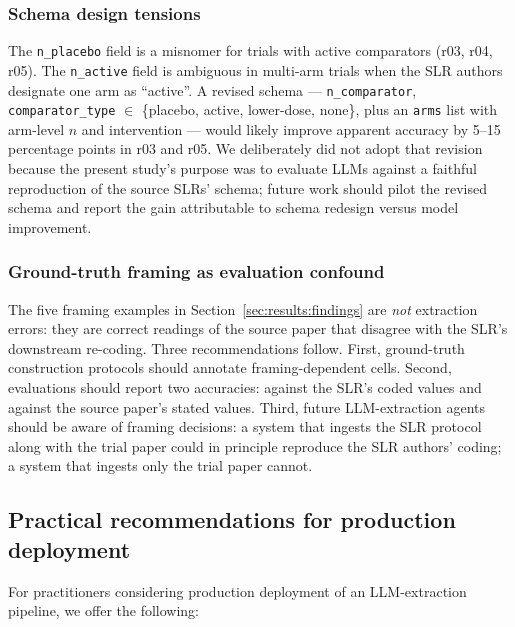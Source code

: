 \documentclass[a4paper,fleqn]{cas-sc}
\begin{document}
\subsubsection{Schema design tensions}

The \texttt{n\_placebo} field is a misnomer for trials with active
comparators (r03, r04, r05). The \texttt{n\_active} field is ambiguous
in multi-arm trials when the SLR authors designate one arm as ``active''.
A revised schema --- \texttt{n\_comparator}, \texttt{comparator\_type}
$\in$ \{placebo, active, lower-dose, none\}, plus an
\texttt{arms} list with arm-level $n$ and intervention --- would
likely improve apparent accuracy by 5--15 percentage points in r03 and r05.
We deliberately did not adopt that revision because the present study's
purpose was to evaluate LLMs against a faithful reproduction of the
source SLRs' schema; future work should pilot the revised schema and
report the gain attributable to schema redesign versus model
improvement.

\subsubsection{Ground-truth framing as evaluation confound}

The five framing examples in Section~\ref{sec:results:findings} are
\emph{not} extraction errors: they are correct readings of the source
paper that disagree with the SLR's downstream re-coding. Three
recommendations follow. First, ground-truth construction protocols
should annotate framing-dependent cells. Second, evaluations should
report two accuracies: against the SLR's coded values and against the
source paper's stated values. Third, future LLM-extraction agents should
be aware of framing decisions: a system that ingests the SLR protocol
along with the trial paper could in principle reproduce the SLR
authors' coding; a system that ingests only the trial paper cannot.

\subsection{Practical recommendations for production deployment}

For practitioners considering production deployment of an LLM-extraction
pipeline, we offer the following:
\end{document}
